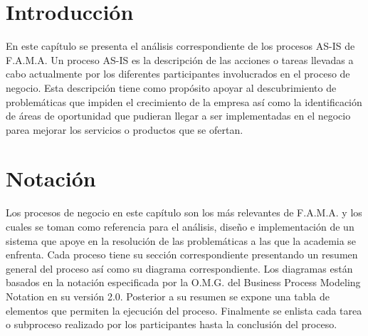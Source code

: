 


\section{Introducción}
En este capítulo se presenta el análisis correspondiente de los procesos AS-IS de F.A.M.A. Un proceso AS-IS es la descripción de las acciones o tareas llevadas a cabo actualmente por los diferentes participantes involucrados en el proceso de negocio. Esta descripción tiene como propósito apoyar al descubrimiento de problemáticas que impiden el crecimiento de la empresa así como la identificación de áreas de oportunidad que pudieran llegar a ser implementadas en el negocio parea mejorar los servicios o productos que se ofertan.


\section{Notación}

Los procesos de negocio en este capítulo son los más relevantes de F.A.M.A. y los cuales se toman como referencia para el análisis, diseño e implementación de un sistema que apoye en la resolución de las problemáticas a las que la academia se enfrenta. Cada proceso tiene su sección correspondiente presentando un resumen general del proceso así como su diagrama correspondiente. Los diagramas están basados en la notación especificada por la O.M.G. del Business Process Modeling Notation en su versión 2.0. Posterior a su resumen se expone una tabla de elementos que permiten la ejecución del proceso. Finalmente se enlista cada tarea o subproceso realizado por los participantes hasta la conclusión del proceso.

